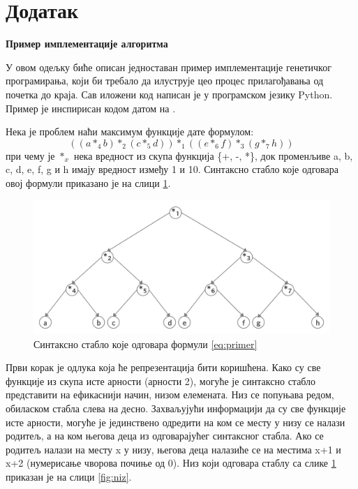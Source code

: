 \documentclass[a4paper]{article}
\begin{document}
\appendix
 


\appendix
\section{Додатак}

\bigskip
\noindent
\textbf{\large Пример имплементације алгоритма}\newline
\label{implementacija}

У овом одељку биће описан једноставан пример имплементације генетичког програмирања, који би требало да илуструје цео процес прилагођавања од почетка до краја. Сав иложени код написан је у програмском језику Python. Пример је инспирисан кодом датом на \cite{ri}. \newline

Нека је проблем наћи максимум функције дате формулом:
\begin{equation} 
    \label{eq:primer}
    ((a *_4 b) *_2 (c *_5 d)) *_1 ((e *_6 f) *_3 (g *_7 h))
\end{equation}
при чему је $*_x$ нека вредност из скупа функција \{+, -, *\}, док променљиве a, b, c, d, e, f, g и h имају вредност између 1 и 10. Синтаксно стабло које одговара овој формули приказано је на слици \ref{fig:stablo}. \newline

\begin{figure}[ht!]
    \begin{center}
    \includegraphics[scale=0.14]{stablo_primera.png}
    \end{center}
    \caption{Синтаксно стабло које одговара формули \eqref{eq:primer}}
    \label{fig:stablo}
\end{figure}

Први корак је одлука која ће репрезентација бити коришћена. Како су све функције из скупа исте арности (арности 2), могуће је синтаксно стабло представити на ефикаснији начин, низом елемената. Низ се попуњава редом,  обиласком стабла слева на десно. Захваљујући информацији да су све функције исте арности, могуће је јединствено одредити на ком се месту у низу се налази родитељ, а на ком његова деца из одговарајућег синтаксног стабла. Ако се родитељ налази на месту x у низу, његова деца налазиће се на местима x+1 и x+2 (нумерисање чворова почиње од 0). Низ који одговара стаблу са слике \ref{fig:stablo} приказан је на слици \ref{fig:niz}. \newline
\end{document}
